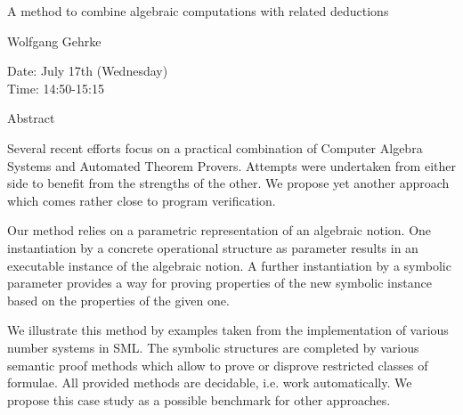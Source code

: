 \begin{center}
\LARGE
A method to combine algebraic computations with related
                           deductions
\end{center}

\begin{center}
\Large
Wolfgang Gehrke
\end{center}

\noindent
Date:  July 17th (Wednesday)\\
Time:  14:50-15:15\\

\begin{center}
\large
Abstract
\end{center}

Several recent efforts focus on a practical combination of Computer Algebra Systems and
Automated Theorem Provers. Attempts were undertaken from either side to benefit from the
strengths of the other. We propose yet another approach which comes rather close to program
verification. 

Our method relies on a parametric representation of an algebraic notion. One instantiation by a
concrete operational structure as parameter results in an executable instance of the algebraic
notion. A further instantiation by a symbolic parameter provides a way for proving properties of
the new symbolic instance based on the properties of the given one. 

We illustrate this method by examples taken from the implementation of various number systems
in SML. The symbolic structures are completed by various semantic proof methods which allow to
prove or disprove restricted classes of formulae. All provided methods are decidable, i.e. work
automatically. We propose this case study as a possible benchmark for other approaches. 

